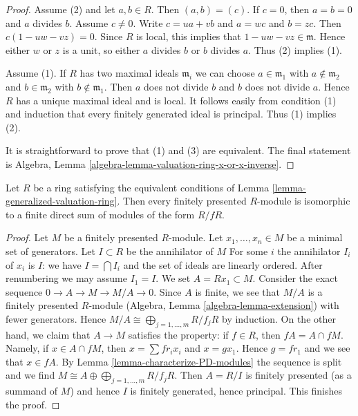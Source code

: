 \begin{proof}
Assume (2) and let $a, b \in R$. Then $(a, b) = (c)$. If $c = 0$,
then $a = b = 0$ and $a$ divides $b$. Assume $c \not = 0$. Write
$c = ua + vb$ and $a = wc$ and $b = zc$. Then $c(1 - uw - vz) = 0$.
Since $R$ is local, this implies that $1 - uw - vz \in \mathfrak m$.
Hence either $w$ or $z$ is a unit, so either $a$ divides $b$ or
$b$ divides $a$. Thus (2) implies (1).

\medskip\noindent
Assume (1). If $R$ has two maximal ideals $\mathfrak m_i$
we can choose $a \in \mathfrak m_1$ with $a \not \in \mathfrak m_2$
and $b \in \mathfrak m_2$ with $b \not \in \mathfrak m_1$.
Then $a$ does not divide $b$ and $b$ does not divide $a$.
Hence $R$ has a unique maximal ideal and is local.
It follows easily from condition (1) and induction that every
finitely generated ideal is principal. Thus (1) implies (2).

\medskip\noindent
It is straightforward to prove that (1) and (3) are equivalent.
The final statement is Algebra, Lemma
\ref{algebra-lemma-valuation-ring-x-or-x-inverse}.
\end{proof}

\begin{lemma}
\label{lemma-generalized-valuation-ring-modules}
\begin{reference}
\cite[Theorem 1]{Warfield-Decomposition}
\end{reference}
Let $R$ be a ring satisfying the equivalent conditions of
Lemma \ref{lemma-generalized-valuation-ring}.
Then every finitely presented $R$-module
is isomorphic to a finite direct sum of modules of the form $R/fR$.
\end{lemma}

\begin{proof}
Let $M$ be a finitely presented $R$-module. Let $x_1, \ldots, x_n \in M$
be a minimal set of generators. Let $I \subset R$ be the annihilator of $M$
For some $i$ the annihilator $I_i$ of $x_i$ is $I$:
we have $I = \bigcap I_i$ and the set of ideals are linearly ordered.
After renumbering we may assume $I_1 = I$. We set
$A = Rx_1 \subset M$. Consider the exact sequence
$0 \to A \to M \to M/A \to 0$. Since $A$ is finite, we see that
$M/A$ is a finitely presented $R$-module
(Algebra, Lemma \ref{algebra-lemma-extension}) with fewer generators.
Hence $M/A \cong \bigoplus_{j = 1, \ldots, m} R/f_jR$ by induction.
On the other hand, we claim that $A \to M$ satisfies the property:
if $f \in R$, then $fA = A \cap fM$. Namely, if $x \in A \cap fM$,
then $x = \sum f r_i x_i$ and $x = gx_1$. Hence $g = fr_1$ and
we see that $x \in fA$. By Lemma \ref{lemma-characterize-PD-modules}
the sequence is split
and we find $M \cong A \oplus \bigoplus_{j = 1, \ldots, m} R/f_jR$.
Then $A = R/I$ is finitely presented (as a summand of $M$)
and hence $I$ is finitely generated, hence principal.
This finishes the proof.
\end{proof}

